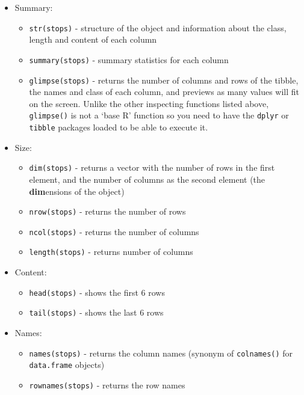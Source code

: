 \documentclass[
]{book}
\providecommand{\tightlist}{%
  \setlength{\itemsep}{0pt}\setlength{\parskip}{0pt}}
\begin{document}
\begin{itemize}
\tightlist
\item
  Summary:

  \begin{itemize}
  \tightlist
  \item
    \texttt{str(stops)} - structure of the object and information about the class, length and
    content of each column
  \item
    \texttt{summary(stops)} - summary statistics for each column
  \item
    \texttt{glimpse(stops)} - returns the number of columns and rows of the tibble, the names and class of each column, and previews as many values will fit on the screen. Unlike the other inspecting functions listed above, \texttt{glimpse()} is not a `base R' function so you need to have the \texttt{dplyr} or \texttt{tibble} packages loaded to be able to execute it.
  \end{itemize}
\item
  Size:

  \begin{itemize}
  \tightlist
  \item
    \texttt{dim(stops)} - returns a vector with the number of rows in the first element,
    and the number of columns as the second element (the \textbf{dim}ensions of
    the object)
  \item
    \texttt{nrow(stops)} - returns the number of rows
  \item
    \texttt{ncol(stops)} - returns the number of columns
  \item
    \texttt{length(stops)} - returns number of columns
  \end{itemize}
\item
  Content:

  \begin{itemize}
  \tightlist
  \item
    \texttt{head(stops)} - shows the first 6 rows
  \item
    \texttt{tail(stops)} - shows the last 6 rows
  \end{itemize}
\item
  Names:

  \begin{itemize}
  \tightlist
  \item
    \texttt{names(stops)} - returns the column names (synonym of \texttt{colnames()} for \texttt{data.frame}
    objects)
  \item
    \texttt{rownames(stops)} - returns the row names
  \end{itemize}
\end{itemize}
\end{document}
